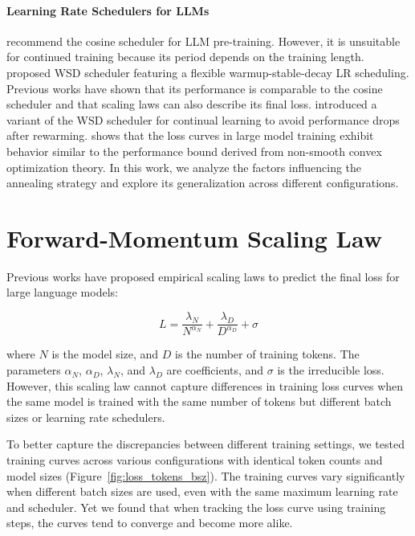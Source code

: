 \documentclass[letterpaper]{article} %
\begin{document}
\paragraph{Learning Rate Schedulers for LLMs}
\citet{rae2021scaling, Hoffmann2022TrainingCL} recommend the cosine scheduler \citep{loshchilov2017sgdrstochasticgradientdescent} for LLM pre-training. However, it is unsuitable for continued training because its period depends on the training length. \citet{Zhai2021ScalingVT, Raffel2019ExploringTL, Hu2024MiniCPMUT} proposed WSD scheduler featuring a flexible warmup-stable-decay LR scheduling. Previous works \citep{tissue2024scaling, hagele2024scaling} have shown that its performance is comparable to the cosine scheduler and that scaling laws can also describe its final loss. \citet{Wen2024UnderstandingWL} introduced a variant of the WSD scheduler for continual learning to avoid performance drops after rewarming. \citet{defazio2024optimallineardecaylearning, schaipp2025surprisingagreementconvexoptimization} shows that the loss curves in large model training exhibit behavior similar to the performance bound derived from non-smooth convex optimization theory. In this work, we analyze the factors influencing the annealing strategy and explore its generalization across different configurations.

\section{Forward-Momentum Scaling Law}

Previous works \cite{Kaplan2020ScalingLF, Hoffmann2022TrainingCL} have proposed empirical scaling laws to predict the final loss for large language models:

\begin{equation}
    L = \frac{\lambda_N}{N^{\alpha_N}} + \frac{\lambda_D}{D^{\alpha_D}} + \sigma
\label{eq:loss_N_D_function}
\end{equation}

\noindent where \( N \) is the model size, and \( D \) is the number of training tokens. The parameters \( \alpha_N \), \( \alpha_D \), \( \lambda_N \), and \( \lambda_D \) are coefficients, and \( \sigma \) is the irreducible loss. However, this scaling law cannot capture differences in training loss curves when the same model is trained with the same number of tokens but different batch sizes or learning rate schedulers.

To better capture the discrepancies between different training settings, we tested training curves across various configurations with identical token counts and model sizes (Figure~\ref{fig:loss_tokens_bsz}). The training curves vary significantly when different batch sizes are used, even with the same maximum learning rate and scheduler. Yet we found that when tracking the loss curve using training steps, the curves tend to converge and become more alike.
\end{document}
